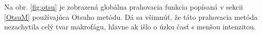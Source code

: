 \documentclass[a4paper,11pt,oneside]{article}%
\begin{document}

Na obr. \ref{fig:otsu} je zobrazená globálna prahovacia funkcia popísaná v sekcii \ref{OtsuM} používajúca Otsuho metódu. Dá sa všimnúť, že táto prahovacia metóda nezachytila celý tvar makrofágu, hlavne ak išlo o úzku časť s menšou intenzitou.

\begin{figure}[H]  
    \hspace{5px}

\end{figure}
\end{document}
